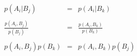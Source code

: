 \begin{equation}
	\begin{array}{lll}
		p(A_i| B_j)               & = & p(A_i|B_k)                \\
		                          &   &                           \\
		\frac{p(A_i,B_j)}{p(B_j)} & = & \frac{p(A_i,B_k)}{p(B_k)} \\
		                          &   &                           \\
		p(A_i,B_j)p(B_k)          & = & p(A_i,B_k)p(B_j)
	\end{array}
\end{equation}
